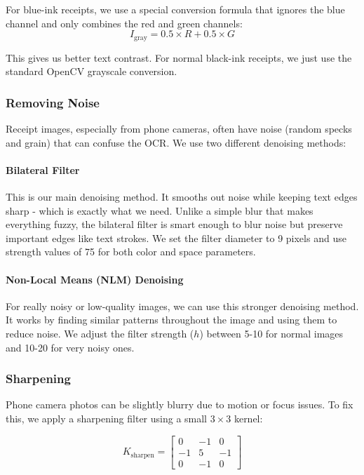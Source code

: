 For blue-ink receipts, we use a special conversion formula that ignores the blue channel and only combines the red and green channels:
\begin{equation}
    I_{\text{gray}} = 0.5 \times R + 0.5 \times G
\end{equation}

This gives us better text contrast. For normal black-ink receipts, we just use the standard OpenCV grayscale conversion.

\subsubsection{Removing Noise}

Receipt images, especially from phone cameras, often have noise (random specks and grain) that can confuse the OCR. We use two different denoising methods:

\paragraph{Bilateral Filter}
This is our main denoising method. It smooths out noise while keeping text edges sharp - which is exactly what we need. Unlike a simple blur that makes everything fuzzy, the bilateral filter is smart enough to blur noise but preserve important edges like text strokes. We set the filter diameter to 9 pixels and use strength values of 75 for both color and space parameters.

\paragraph{Non-Local Means (NLM) Denoising}
For really noisy or low-quality images, we can use this stronger denoising method. It works by finding similar patterns throughout the image and using them to reduce noise. We adjust the filter strength ($h$) between 5-10 for normal images and 10-20 for very noisy ones.


\subsubsection{Sharpening}

Phone camera photos can be slightly blurry due to motion or focus issues. To fix this, we apply a sharpening filter using a small $3 \times 3$ kernel:

\begin{equation}
    K_{\text{sharpen}} = \begin{bmatrix}
        0  & -1 & 0  \\
        -1 & 5  & -1 \\
        0  & -1 & 0
    \end{bmatrix}
\end{equation}


